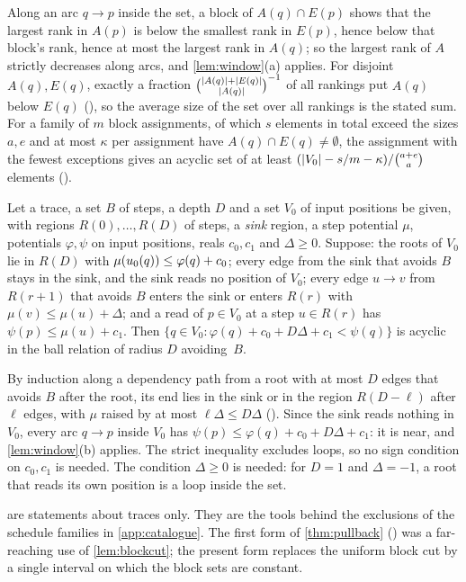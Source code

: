 \begin{outline}
Along an arc $q\to p$ inside the set, a block of $A(q)\cap E(p)$ shows that the largest rank in $A(p)$ is below the smallest rank in $E(p)$,
hence below that block's rank, hence at most the largest rank in $A(q)$; so the largest rank of $A$ strictly decreases along arcs, and
\cref{lem:window}(a) applies. For disjoint $A(q),E(q)$, exactly a fraction $\binom{\lvert A(q) \rvert+\lvert E(q) \rvert}{\lvert A(q) \rvert}^{-1}$ of all rankings
put $A(q)$ below $E(q)$ (), so the average size of the set over all rankings is the stated
sum. For a family of $m$ block assignments, of which $s$ elements in total exceed the sizes $a,e$ and at most $\kappa$ per assignment
have $A(q)\cap E(q)\ne\emptyset$, the assignment with the fewest exceptions gives an acyclic set of at least
$(\lvert V_0 \rvert-s/m-\kappa)/\binom{a+e}{a}$ elements ().
\end{outline}

\begin{lemma}\label{lem:stepinv}
Let a trace, a set $B$ of steps, a depth $D$ and a set $V_0$ of input positions be given, with regions $R(0),\dots,R(D)$ of steps, a
\emph{sink} region, a step potential $\mu$, potentials $\varphi,\psi$ on input positions, reals $c_0,c_1$ and $\Delta\ge0$. Suppose:
the roots of $V_0$ lie in $R(D)$ with $\mu(u_0(q))\le\varphi(q)+c_0$; every edge from the sink that avoids $B$ stays in the sink,
and the sink reads no position of $V_0$; every edge $u\to v$ from $R(r+1)$ that avoids $B$ enters the sink or enters $R(r)$ with
$\mu(v)\le\mu(u)+\Delta$; and a read of $p\in V_0$ at a step $u\in R(r)$ has $\psi(p)\le\mu(u)+c_1$. Then
$\{q\in V_0:\varphi(q)+c_0+D\Delta+c_1<\psi(q)\}$ is acyclic in the ball relation of radius $D$ avoiding~$B$.
\end{lemma}

\begin{outline}
By induction along a dependency path from a root with at most $D$ edges that avoids $B$ after the root, its end lies in the sink or in
the region $R(D-\ell)$ after $\ell$ edges, with $\mu$ raised by at most $\ell\Delta\le D\Delta$
(). Since the sink reads nothing in $V_0$, every arc $q\to p$ inside $V_0$ has
$\psi(p)\le\varphi(q)+c_0+D\Delta+c_1$: it is near, and \cref{lem:window}(b) applies. The strict inequality excludes loops, so no
sign condition on $c_0,c_1$ is needed. The condition $\Delta\ge0$ is needed: for $D=1$ and $\Delta=-1$, a root that reads its own
position is a loop inside the set.
\end{outline}

 are statements about traces only. They are the tools behind the exclusions of the
schedule families in \cref{app:catalogue}. The first form of \cref{thm:pullback} () was a far-reaching use of \cref{lem:blockcut};
the present form replaces the uniform block cut by a single interval on which the block sets are constant.
